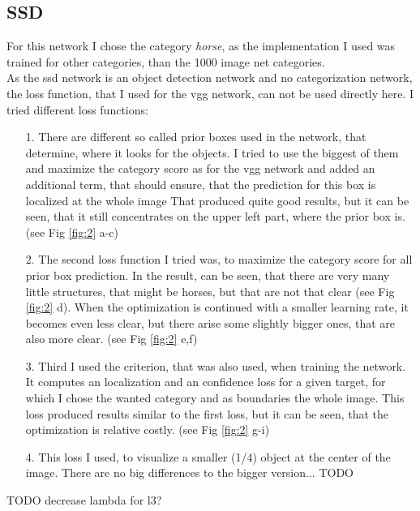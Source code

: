 \documentclass[a4paper, 10pt, deutsch]{llncs}
\begin{document}
\subsection{SSD}

For this network I chose the category \textit{horse}, as the implementation I used was trained for other categories, than the 1000 image net categories.\\
As the ssd network is an object detection network and no categorization network, the loss function, that I used for the vgg network, can not be used directly here.
I tried different loss functions:
\begin{itemize}
\item[1.]There are different so called prior boxes used in the network, that determine, where it looks for the objects. I tried to use the biggest of them and maximize the category score as for the vgg network and added an additional term, that should ensure, that the prediction for this box is localized at the whole image That produced quite good results, but it can be seen, that it still concentrates on the upper left part, where the prior box is. (see Fig \ref{fig:2} a-c)\\
\item[2.]The second loss function I tried was, to maximize the category score for all prior box prediction. In the result, can be seen, that there are very many little structures, that might be horses, but that are not that clear (see Fig \ref{fig:2} d). When the optimization is continued with a smaller learning rate, it becomes even less clear, but there arise some slightly bigger ones, that are also more clear. (see Fig \ref{fig:2} e,f)\\
\item[3.]Third I used the criterion, that was also used, when training the network. It computes an localization and an confidence loss for a given target, for which I chose the wanted category and as boundaries the whole image. This loss produced results similar to the first loss, but it can be seen, that the optimization is relative costly. (see Fig \ref{fig:2} g-i)\\
\item[4.]This loss I used, to visualize a smaller (1/4) object at the center of the image. There are no big differences to the bigger version... TODO
\end{itemize}

TODO decrease lambda for l3?
\end{document}
